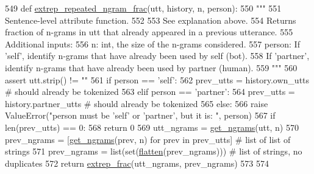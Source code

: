 \begin{DoxyCode}
549 \textcolor{keyword}{def }\hyperlink{namespaceprojects_1_1controllable__dialogue_1_1controllable__seq2seq_1_1controls_acf2eb363af8558f8f2e8afbacdc52c07}{extrep\_repeated\_ngram\_frac}(utt, history, n, person):
550     \textcolor{stringliteral}{"""}
551 \textcolor{stringliteral}{    Sentence-level attribute function.}
552 \textcolor{stringliteral}{}
553 \textcolor{stringliteral}{    See explanation above.}
554 \textcolor{stringliteral}{    Returns fraction of n-grams in utt that already appeared in a previous utterance.}
555 \textcolor{stringliteral}{    Additional inputs:}
556 \textcolor{stringliteral}{      n: int, the size of the n-grams considered.}
557 \textcolor{stringliteral}{      person: If 'self', identify n-grams that have already been used by self (bot).}
558 \textcolor{stringliteral}{        If 'partner', identify n-grams that have already been used by partner (human).}
559 \textcolor{stringliteral}{    """}
560     \textcolor{keyword}{assert} utt.strip() != \textcolor{stringliteral}{""}
561     \textcolor{keywordflow}{if} person == \textcolor{stringliteral}{'self'}:
562         prev\_utts = history.own\_utts  \textcolor{comment}{# should already be tokenized}
563     \textcolor{keywordflow}{elif} person == \textcolor{stringliteral}{'partner'}:
564         prev\_utts = history.partner\_utts  \textcolor{comment}{# should already be tokenized}
565     \textcolor{keywordflow}{else}:
566         \textcolor{keywordflow}{raise} ValueError(\textcolor{stringliteral}{"person must be 'self' or 'partner', but it is: "}, person)
567     \textcolor{keywordflow}{if} len(prev\_utts) == 0:
568         \textcolor{keywordflow}{return} 0
569     utt\_ngrams = \hyperlink{namespaceprojects_1_1controllable__dialogue_1_1controllable__seq2seq_1_1controls_abf6d099074de6b0c663333470eeaa2de}{get\_ngrams}(utt, n)
570     prev\_ngrams = [\hyperlink{namespaceprojects_1_1controllable__dialogue_1_1controllable__seq2seq_1_1controls_abf6d099074de6b0c663333470eeaa2de}{get\_ngrams}(prev, n) \textcolor{keywordflow}{for} prev \textcolor{keywordflow}{in} prev\_utts]  \textcolor{comment}{# list of list of strings}
571     prev\_ngrams = list(set(\hyperlink{namespaceprojects_1_1controllable__dialogue_1_1controllable__seq2seq_1_1controls_a0db4b9d9584cef90aa2515a75e741774}{flatten}(prev\_ngrams)))  \textcolor{comment}{# list of strings, no duplicates}
572     \textcolor{keywordflow}{return} \hyperlink{namespaceprojects_1_1controllable__dialogue_1_1controllable__seq2seq_1_1controls_a24fbafb2553fb93db247bb7e2339b1e4}{extrep\_frac}(utt\_ngrams, prev\_ngrams)
573 
574 
\end{DoxyCode}

